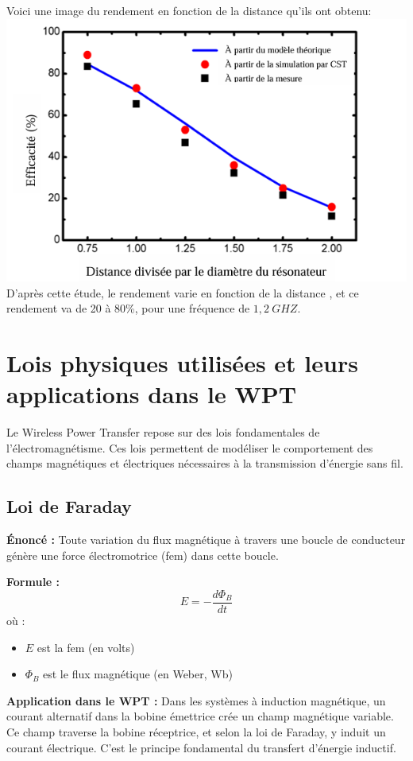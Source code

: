 \documentclass[12pt,a4paper,titlepage,notitlepage]{article}
\begin{document}
	
	Voici une image du rendement en fonction de la distance qu'ils ont obtenu:\\
	\includegraphics[width=1\textwidth]{WPT_disc_1}\\
	D'après cette étude, le rendement varie en fonction de la distance , et ce rendement va de 20 à 80\%, pour une fréquence de $1,2 \ GHZ$.  
	
	
	
	
	
	\section{Lois physiques utilisées et leurs applications dans le WPT}
	Le Wireless Power Transfer repose sur des lois fondamentales de l’électromagnétisme. Ces lois permettent de modéliser le comportement des champs magnétiques et électriques nécessaires à la transmission d’énergie sans fil.
	
	\subsection{Loi de Faraday}
	\textbf{Énoncé :} Toute variation du flux magnétique à travers une boucle de conducteur génère une force électromotrice (fem) dans cette boucle.
	
	\textbf{Formule :}
	\[
	E = -\frac{d\Phi_B}{dt}
	\]
	où :
	\begin{itemize}
		\item \(E\) est la fem (en volts)
		\item \(\Phi_B\) est le flux magnétique (en Weber, Wb)
	\end{itemize}
	
	\textbf{Application dans le WPT :} Dans les systèmes à induction magnétique, un courant alternatif dans la bobine émettrice crée un champ magnétique variable. Ce champ traverse la bobine réceptrice, et selon la loi de Faraday, y induit un courant électrique. C’est le principe fondamental du transfert d’énergie inductif.
	
\end{document}
